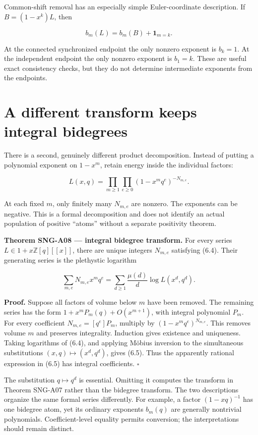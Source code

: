 \documentclass[
  11pt,
  a4paper,
]{report}
\begin{document}
Common-shift removal has an especially simple Euler-coordinate
description. If \(B=(1-x^k)L\), then

\[
 b_m(L)=b_m(B)+\mathbf1_{m=k}.
\]

At the connected synchronized endpoint the only nonzero exponent is
\(b_k=1\). At the independent endpoint the only nonzero exponent is
\(b_1=k\). These are useful exact consistency checks, but they do not
determine intermediate exponents from the endpoints.

\hypertarget{a-different-transform-keeps-integral-bidegrees}{%
\section{A different transform keeps integral
bidegrees}\label{a-different-transform-keeps-integral-bidegrees}}

There is a second, genuinely different product decomposition. Instead of
putting a polynomial exponent on \(1-x^m\), retain energy inside the
individual factors:

\[
 L(x,q)=\prod_{m\ge1}\prod_{e\ge0}
 (1-x^m q^e)^{-N_{m,e}}.
 \tag{6.4}
\]

At each fixed \(m\), only finitely many \(N_{m,e}\) are nonzero. The
exponents can be negative. This is a formal decomposition and does not
identify an actual population of positive ``atoms'' without a separate
positivity theorem.

\textbf{Theorem SNG-A08 --- integral bidegree transform.} For every
series \(L\in1+x\mathbb Z[q][[x]]\), there are unique integers
\(N_{m,e}\) satisfying (6.4). Their generating series is the plethystic
logarithm

\[
 \sum_{m,e}N_{m,e}x^m q^e
 =\sum_{d\ge1}\frac{\mu(d)}d\log L(x^d,q^d).
 \tag{6.5}
\]

\textbf{Proof.} Suppose all factors of volume below \(m\) have been
removed. The remaining series has the form \(1+x^mP_m(q)+O(x^{m+1})\),
with integral polynomial \(P_m\). For every coefficient
\(N_{m,e}=[q^e]P_m\), multiply by \((1-x^mq^e)^{N_{m,e}}\). This removes
volume \(m\) and preserves integrality. Induction gives existence and
uniqueness. Taking logarithms of (6.4), and applying Möbius inversion to
the simultaneous substitutions \((x,q)\mapsto(x^d,q^d)\), gives (6.5).
Thus the apparently rational expression in (6.5) has integral
coefficients. \(\square\)

The substitution \(q\mapsto q^d\) is essential. Omitting it computes the
transform in Theorem SNG-A07 rather than the bidegree transform. The two
descriptions organize the same formal series differently. For example, a
factor \((1-xq)^{-1}\) has one bidegree atom, yet its ordinary exponents
\(b_m(q)\) are generally nontrivial polynomials. Coefficient-level
equality permits conversion; the interpretations should remain distinct.
\end{document}
